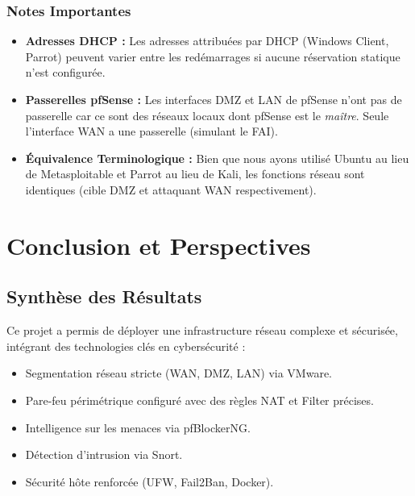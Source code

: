 \documentclass[12pt,a4paper,openany]{report}
\begin{document}
	\subsection{Notes Importantes}
	\begin{itemize}
		\item \textbf{Adresses DHCP :} Les adresses attribuées par DHCP (Windows Client, Parrot) peuvent varier entre les redémarrages si aucune réservation statique n'est configurée.
		
		\item \textbf{Passerelles pfSense :} Les interfaces DMZ et LAN de pfSense n'ont pas de passerelle car ce sont des réseaux locaux dont pfSense est le \textit{maître}. Seule l'interface WAN a une passerelle (simulant le FAI).
		
		\item \textbf{Équivalence Terminologique :} Bien que nous ayons utilisé Ubuntu au lieu de Metasploitable et Parrot au lieu de Kali, les fonctions réseau sont identiques (cible DMZ et attaquant WAN respectivement).
	\end{itemize}
	
	
	\chapter{Conclusion et Perspectives}
	
	\section{Synthèse des Résultats}
	Ce projet a permis de déployer une infrastructure réseau complexe et sécurisée, intégrant des technologies clés en cybersécurité :
	\begin{itemize}
		\item Segmentation réseau stricte (WAN, DMZ, LAN) via VMware.
		\item Pare-feu périmétrique configuré avec des règles NAT et Filter précises.
		\item Intelligence sur les menaces via pfBlockerNG.
		\item Détection d'intrusion via Snort.
		\item Sécurité hôte renforcée (UFW, Fail2Ban, Docker).
	\end{itemize}
	
\end{document}
